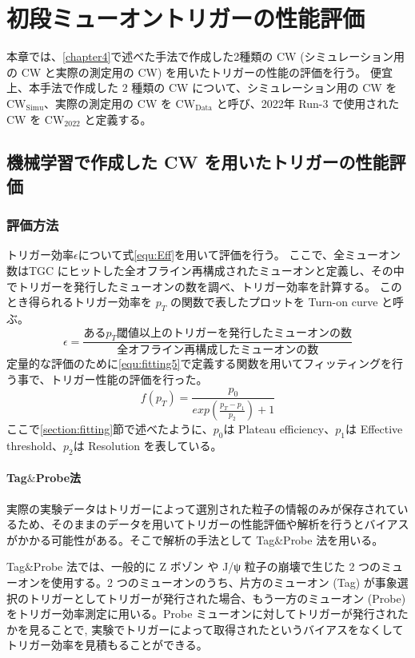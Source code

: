 \chapter{初段ミューオントリガーの性能評価}\label{chapter5}
本章では、\ref{chapter4}で述べた手法で作成した2種類の CW (シミュレーション用の CW と実際の測定用の CW) を用いたトリガーの性能の評価を行う。
便宜上、本手法で作成した 2 種類の CW について、シミュレーション用の CW を $\mathrm{CW_{Simu}}$、実際の測定用の CW を $\mathrm{CW_{Data}}$ と呼び、2022年 Run-3 で使用された CW を $\mathrm{CW_{2022}}$ と定義する。

\section{機械学習で作成した CW を用いたトリガーの性能評価}
\subsection{評価方法}
トリガー効率$\epsilon$について式\ref{equ:Eff}を用いて評価を行う。
ここで、全ミューオン数はTGC にヒットした全オフライン再構成されたミューオンと定義し、その中でトリガーを発行したミューオンの数を調べ、トリガー効率を計算する。
このとき得られるトリガー効率を $p_T$ の関数で表したプロットを Turn-on curve と呼ぶ。
\begin{equation}
　   \epsilon = \frac{ある p_T 閾値以上のトリガーを発行したミューオンの数}{全オフライン再構成したミューオンの数}
　\label{equ:Eff}
\end{equation}
定量的な評価のために\eqref{equ:fitting5}で定義する関数を用いてフィッティングを行う事で、トリガー性能の評価を行った。
\begin{equation}
    f(p_T) = \frac{p_0}{exp(\frac{p_T-p_1}{p_2})+1}
　\label{equ:fitting5}
\end{equation}
ここで\ref{section:fitting}節で述べたように、$p_0$は Plateau efficiency、$p_1$は Effective threshold、$p_2$は Resolution を表している。

\subsubsection{Tag$\&$Probe法}
実際の実験データはトリガーによって選別された粒子の情報のみが保存されているため、そのままのデータを用いてトリガーの性能評価や解析を行うとバイアスがかかる可能性がある。そこで解析の手法として Tag$\&$Probe 法を用いる。

Tag$\&$Probe 法では、一般的に Z ボゾン や J/ψ 粒子の崩壊で生じた 2 つのミューオンを使用する。2 つのミューオンのうち、片方のミューオン (Tag) が事象選択のトリガーとしてトリガーが発行された場合、もう一方のミューオン (Probe) をトリガー効率測定に用いる。Probe ミューオンに対してトリガーが発行されたかを見ることで, 実験でトリガーによって取得されたというバイアスをなくしてトリガー効率を見積もることができる。

